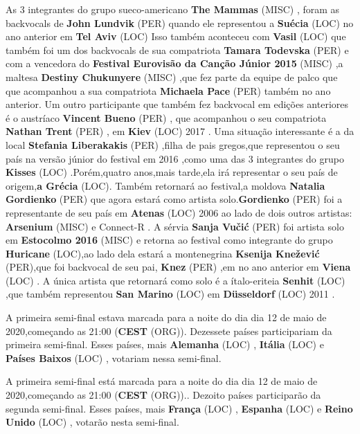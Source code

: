 \documentclass[12pt,a4paper]{article}
\begin{document}
As 3 integrantes do grupo sueco-americano \textbf{The Mammas} (MISC) , foram as backvocals de \textbf{John Lundvik} (PER) quando ele representou a \textbf{Suécia} (LOC) no ano anterior em \textbf{Tel Aviv} (LOC) Isso também aconteceu com \textbf{Vasil} (LOC) que também foi um dos backvocals de sua compatriota \textbf{Tamara Todevska} (PER) e com a vencedora do \textbf{Festival Eurovisão da Canção Júnior 2015} (MISC) ,a maltesa \textbf{Destiny Chukunyere} (MISC) ,que fez parte da equipe de palco que que acompanhou a sua compatriota \textbf{Michaela Pace} (PER) também no ano anterior. Um outro participante que também fez backvocal em edições anteriores é o austríaco \textbf{Vincent Bueno} (PER) , que acompanhou o seu compatriota \textbf{Nathan Trent} (PER) , em \textbf{Kiev} (LOC) 2017 . Uma situação interessante é a da local \textbf{Stefania Liberakakis} (PER) ,filha de pais gregos,que representou o seu país na versão júnior do festival em 2016 ,como uma das 3 integrantes do grupo \textbf{Kisses} (LOC) .Porém,quatro anos,mais tarde,ela irá representar o seu país de origem,\textbf{a Grécia} (LOC). Também retornará ao festival,a moldova \textbf{Natalia Gordienko} (PER) que agora estará como artista solo.\textbf{Gordienko} (PER) foi a representante de seu país em \textbf{Atenas} (LOC) 2006 ao lado de dois outros artistas: \textbf{Arsenium} (MISC) e Connect-R . A sérvia \textbf{Sanja Vučić} (PER) foi artista solo em \textbf{Estocolmo 2016} (MISC) e retorna ao festival como integrante do grupo \textbf{Huricane} (LOC),ao lado dela estará a montenegrina \textbf{Ksenija Knežević} (PER),que foi backvocal de seu pai, \textbf{Knez} (PER) ,em no ano anterior em \textbf{Viena} (LOC) . A única artista que retornará como solo é a ítalo-eriteia \textbf{Senhit} (LOC) ,que também representou \textbf{San Marino} (LOC) em \textbf{Düsseldorf} (LOC) 2011 .

A primeira semi-final estava marcada para a noite do dia dia 12 de maio de 2020,começando as 21:00 (\textbf{CEST} (ORG)). Dezessete países participariam da primeira semi-final. Esses países, mais \textbf{Alemanha} (LOC) , \textbf{Itália} (LOC) e \textbf{Países Baixos} (LOC) , votariam nessa semi-final.

A primeira semi-final está marcada para a noite do dia dia 12 de maio de 2020,começando as 21:00 (\textbf{CEST} (ORG)).. Dezoito países participarão da segunda semi-final. Esses países, mais \textbf{França} (LOC) , \textbf{Espanha} (LOC) e \textbf{Reino Unido} (LOC) , votarão nesta semi-final.
\end{document}
